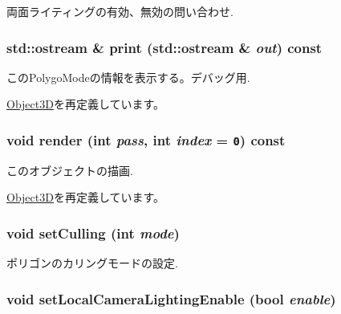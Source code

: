 両面ライティングの有効、無効の問い合わせ. \hypertarget{classm3g_1_1PolygonMode_6fea17fa1532df3794f8cb39cb4f911f}{
\subsubsection[{print}]{\setlength{\rightskip}{0pt plus 5cm}std::ostream \& print (std::ostream \& {\em out}) const}}
\label{classm3g_1_1PolygonMode_6fea17fa1532df3794f8cb39cb4f911f}


このPolygoModeの情報を表示する。デバッグ用. 

\hyperlink{classm3g_1_1Object3D_6fea17fa1532df3794f8cb39cb4f911f}{Object3D}を再定義しています。\hypertarget{classm3g_1_1PolygonMode_1efcb1973989d9963d5bd6d03065d389}{
\subsubsection[{render}]{\setlength{\rightskip}{0pt plus 5cm}void render (int {\em pass}, \/  int {\em index} = {\tt 0}) const}}
\label{classm3g_1_1PolygonMode_1efcb1973989d9963d5bd6d03065d389}


このオブジェクトの描画. 

\hyperlink{classm3g_1_1Object3D_1efcb1973989d9963d5bd6d03065d389}{Object3D}を再定義しています。\hypertarget{classm3g_1_1PolygonMode_55b3fc23392376c00748d68bdf44ca60}{
\subsubsection[{setCulling}]{\setlength{\rightskip}{0pt plus 5cm}void setCulling (int {\em mode})}}
\label{classm3g_1_1PolygonMode_55b3fc23392376c00748d68bdf44ca60}


ポリゴンのカリングモードの設定. \hypertarget{classm3g_1_1PolygonMode_232d4cff53e6fc4863e144dc61e9465c}{
\subsubsection[{setLocalCameraLightingEnable}]{\setlength{\rightskip}{0pt plus 5cm}void setLocalCameraLightingEnable (bool {\em enable})}}
\label{classm3g_1_1PolygonMode_232d4cff53e6fc4863e144dc61e9465c}


